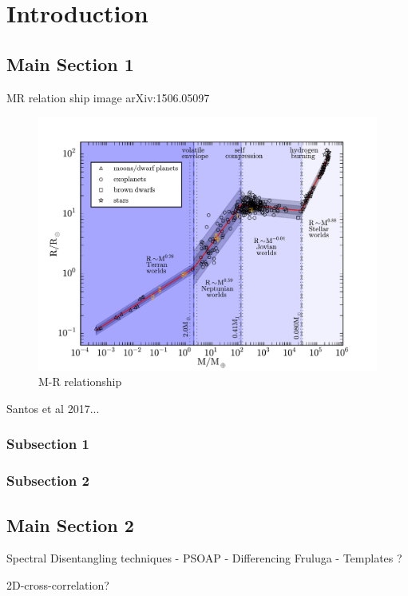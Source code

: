 \chapter{Introduction}  %
\label{cha:introduction} 


\section{Main Section 1}


MR relation ship image arXiv:1506.05097~\citet{chen_probabilistic_2016}

\begin{figure}
    \centering
    \includegraphics[width=0.7\linewidth]{./figures/introduction/plt_overlay_add.pdf}
    \caption{ M-R relationship~\citet{chen_probabilistic_2016}}
    \label{fig:pltoverlayadd}
\end{figure}

Santos et al 2017...

\subsection{Subsection 1}



\subsection{Subsection 2}


\section{Main Section 2}


Spectral Disentangling techniques
- PSOAP
- Differencing Fruluga
- Templates ? 


2D-cross-correlation?

